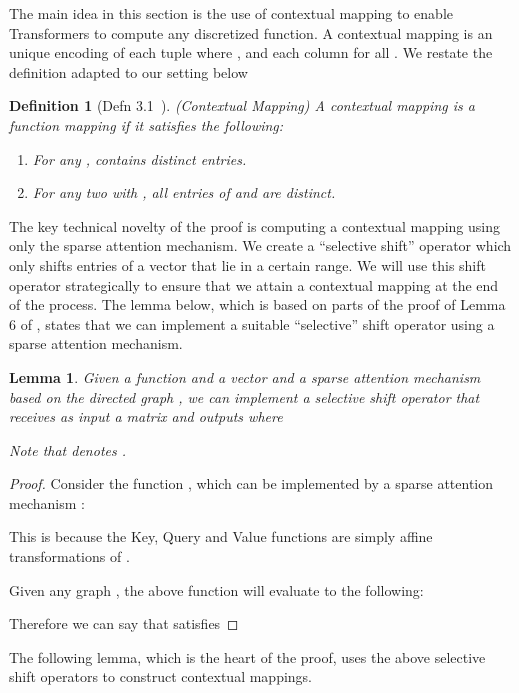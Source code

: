 \documentclass{article}
\newtheorem{lemma}{Lemma}
\newtheorem{definition}{Definition}
\begin{document}
The main idea in this section is the use of contextual mapping to enable Transformers 
to compute any discretized function. A contextual mapping is an unique encoding of each 
tuple   where  , and  each column  for all . 
We restate the definition adapted to our setting below
\begin{definition}[Defn 3.1~\cite{Yun19}] (Contextual Mapping)
\label{defn:contextual-mapping}
A contextual mapping is a function mapping   if it satisfies the following:
    \begin{enumerate}
        \item For any ,    contains distinct entries.
        \item For any two  with , all entries of  and  
            are distinct. 
    \end{enumerate}
\end{definition}

The key technical novelty of the proof is computing a contextual mapping using only the 
sparse attention mechanism.  We create a 
``selective shift'' operator which only shifts entries of a vector that 
lie in  a certain range.  We will use this shift operator strategically to ensure that 
we attain a contextual mapping at the end of the process. 
The lemma below, which is based on parts of the proof of Lemma 6 of \cite{Yun19}, 
states that we can implement a suitable ``selective'' shift operator using a 
sparse attention mechanism. 
\begin{lemma}
    Given a function  and a vector  and a sparse attention mechanism
    based on the directed graph , we can implement a selective shift operator that receives as input
    a matrix   and outputs  where
     
    Note that  denotes . 
\end{lemma}
\begin{proof}
    Consider the function , which can be implemented by a sparse attention mechanism :
     
    This is because the Key, Query and Value functions are simply affine transformations of . 
    
    Given any graph , the above function will evaluate to the following:
     
    
    Therefore we can say that  satisfies 
     
\end{proof}

The following lemma, which is the heart of the proof, uses the above selective shift operators
to construct contextual mappings. 
\end{document}
